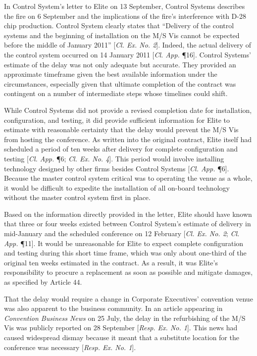 In Control System's letter to Elite on 13 September, Control Systems describes the fire on 6 September and the implications of the fire's interference with D-28 chip production. Control System clearly states that ``Delivery of the control systems and the beginning of installation on the M/S Vis cannot be expected before the middle of January 2011'' [\textit{Cl. Ex. No. 2}]. Indeed, the actual delivery of the control system occurred on 14 January 2011 [\textit{Cl. App.} \P 16]. Control Systems' estimate of the delay was not only adequate but accurate. They provided an approximate timeframe given the best available information under the circumstances, especially given that ultimate completion of the contract was contingent on a number of intermediate steps whose timelines could shift.

While Control Systems did not provide a revised completion date for installation, configuration, and testing, it did provide sufficient information for Elite to estimate with reasonable certainty that the delay would prevent the M/S Vis from hosting the conference. As written into the original contract, Elite itself had scheduled a period of ten weeks after delivery for complete configuration and testing [\textit{Cl. App.} \P 6; \textit{Cl. Ex. No. 4}]. This period would involve installing technology designed by other firms besides Control Systems [\textit{Cl. App.} \P 6]. Because the master control system critical was to operating the venue as a whole, it would be difficult to expedite the installation of all on-board technology without the master control system first in place.  

Based on the information directly provided in the letter, Elite should have known that three or four weeks existed between Control System's estimate of delivery in mid-January and the scheduled conference on 12 February [\textit{Cl. Ex. No. 2}; \textit{Cl. App.} \P 11]. It would be unreasonable for Elite to expect complete configuration and testing during this short time frame, which was only about one-third of the original ten weeks estimated in the contract. As a result, it was Elite's responsibility to procure a replacement as soon as possible and mitigate damages, as specified by Article 44. 

That the delay would require a change in Corporate Executives' convention venue was also apparent to the business community. In an article appearing in \textit{Convention Business News} on 25 July, the delay in the refurbishing of the M/S Vis was publicly reported on 28 September [\textit{Resp. Ex. No. 1}]. This news had caused widespread dismay because it meant that a substitute location for the conference was necessary [\textit{Resp. Ex. No. 1}].

